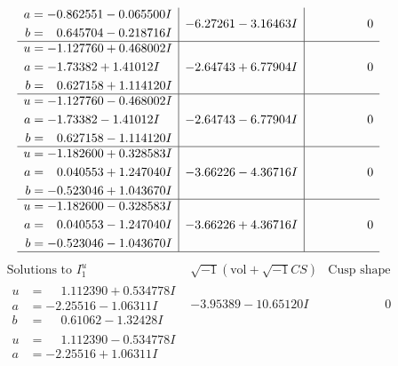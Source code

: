 \documentclass[1p]{elsarticle_modified}
\theoremstyle{definition}
\newcommand{\I}{\sqrt{-1}}
\begin{document}
$$\begin{array}{c|c|c}
\begin{aligned}
a &= -0.862551 - 0.065500 I \\
b &= \phantom{-}0.645704 - 0.218716 I\end{aligned}
 & -6.27261 - 3.16463 I & \phantom{-0.000000 } 0 \\ \hline\begin{aligned}
u &= -1.127760 + 0.468002 I \\
a &= -1.73382 + 1.41012 I \\
b &= \phantom{-}0.627158 + 1.114120 I\end{aligned}
 & -2.64743 + 6.77904 I & \phantom{-0.000000 } 0 \\ \hline\begin{aligned}
u &= -1.127760 - 0.468002 I \\
a &= -1.73382 - 1.41012 I \\
b &= \phantom{-}0.627158 - 1.114120 I\end{aligned}
 & -2.64743 - 6.77904 I & \phantom{-0.000000 } 0 \\ \hline\begin{aligned}
u &= -1.182600 + 0.328583 I \\
a &= \phantom{-}0.040553 + 1.247040 I \\
b &= -0.523046 + 1.043670 I\end{aligned}
 & -3.66226 - 4.36716 I & \phantom{-0.000000 } 0 \\ \hline\begin{aligned}
u &= -1.182600 - 0.328583 I \\
a &= \phantom{-}0.040553 - 1.247040 I \\
b &= -0.523046 - 1.043670 I\end{aligned}
 & -3.66226 + 4.36716 I & \phantom{-0.000000 } 0\\
 \hline 
 \end{array}$$\newpage$$\begin{array}{c|c|c}  
\text{Solutions to }I^u_{1}& \I (\text{vol} + \sqrt{-1}CS) & \text{Cusp shape}\\
 \hline 
\begin{aligned}
u &= \phantom{-}1.112390 + 0.534778 I \\
a &= -2.25516 - 1.06311 I \\
b &= \phantom{-}0.61062 - 1.32428 I\end{aligned}
 & -3.95389 - 10.65120 I & \phantom{-0.000000 } 0 \\ \hline\begin{aligned}
u &= \phantom{-}1.112390 - 0.534778 I \\
a &= -2.25516 + 1.06311 I \\

\end{aligned}
\end{array}$$
\end{document}
